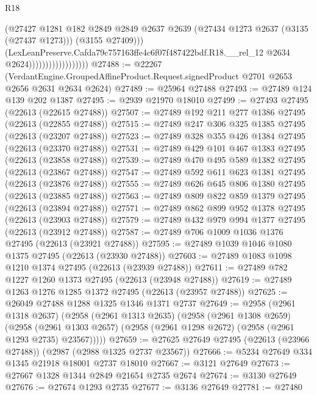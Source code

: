 \begin{lexlean}{R18}
\begin{coremodule}
                                        (@27427
                                          @1281
                                          @182
                                          @2849
                                          @2849
                                          @2637
                                          @2639
                                          (@27434 @1273 @2637 (@3135 (@27437 @1273)))
                                          (@3155 @27409)))
                                      (LexLeanPreserve.Cafda79c757163ffe4c6f07f487422bdf.R18.__rel_12
                                        @2634
                                        @2624))))))))))))))))))
@27488 := @22267
    (VerdantEngine.GroupedAffineProduct.Request.signedProduct @2701 @2653 @2656 @2631 @2634 @2624)
@27489 := @25964 @27488
@27493 := @27489 @124 @139 @202 @1387
@27495 := @2939 @21970 @18010
@27499 := @27493 @27495 (@22613 (@22615 @27488))
@27507 := @27489 @192 @211 @277 @1386 @27495 (@22613 (@22855 @27488))
@27515 := @27489 @247 @306 @325 @1385 @27495 (@22613 (@23207 @27488))
@27523 := @27489 @328 @355 @426 @1384 @27495 (@22613 (@23370 @27488))
@27531 := @27489 @429 @101 @467 @1383 @27495 (@22613 (@23858 @27488))
@27539 := @27489 @470 @495 @589 @1382 @27495 (@22613 (@23867 @27488))
@27547 := @27489 @592 @611 @623 @1381 @27495 (@22613 (@23876 @27488))
@27555 := @27489 @626 @645 @806 @1380 @27495 (@22613 (@23885 @27488))
@27563 := @27489 @809 @822 @859 @1379 @27495 (@22613 (@23894 @27488))
@27571 := @27489 @862 @899 @952 @1378 @27495 (@22613 (@23903 @27488))
@27579 := @27489 @432 @979 @994 @1377 @27495 (@22613 (@23912 @27488))
@27587 := @27489 @706 @1009 @1036 @1376 @27495 (@22613 (@23921 @27488))
@27595 := @27489 @1039 @1046 @1080 @1375 @27495 (@22613 (@23930 @27488))
@27603 := @27489 @1083 @1098 @1210 @1374 @27495 (@22613 (@23939 @27488))
@27611 := @27489 @782 @1227 @1260 @1373 @27495 (@22613 (@23948 @27488))
@27619 := @27489 @1263 @1276 @1285 @1372 @27495 (@22613 (@23957 @27488))
@27625 := @26049 @27488 @1288 @1325 @1346 @1371 @2737
@27649 := @2958
    (@2961 @1318 @2637)
    (@2958
      (@2961 @1313 @2635)
      (@2958
        (@2961 @1308 @2659)
        (@2958 (@2961 @1303 @2657) (@2958 (@2961 @1298 @2672) (@2958 (@2961 @1293 @2735) @23567)))))
@27659 := @27625 @27649 @27495 (@22613 (@23966 @27488)) (@2987 (@2988 @1325 @2737 @23567))
@27666 := @5234 @27649 @334 @1345 @21918 @18001 @2737 @18010
@27667 := @3121 @27649
@27673 := @27667 @1328 @1344 @2849 @21654 @2735 @2674
@27674 := @3130 @27649
@27676 := @27674 @1293 @2735
@27677 := @3136 @27649
@27781 := @27480

\end{coremodule}
\end{lexlean}
